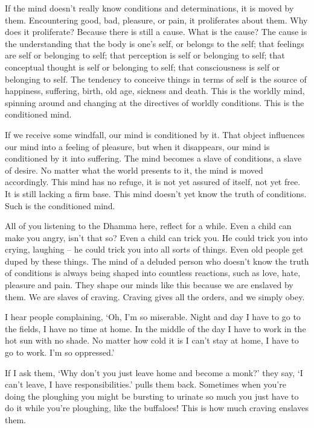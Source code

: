 If the mind doesn't really know conditions and determinations, it is moved by them. Encountering good, bad, pleasure, or pain, it proliferates about them. Why does it proliferate? Because there is still a cause. What is the cause? The cause is the understanding that the body is one's self, or belongs to the self; that feelings are self or belonging to self; that perception is self or belonging to self; that conceptual thought is self or belonging to self; that consciousness is self or belonging to self. The tendency to conceive things in terms of self is the source of happiness, suffering, birth, old age, sickness and death. This is the worldly mind, spinning around and changing at the directives of worldly conditions. This is the conditioned mind.

If we receive some windfall, our mind is conditioned by it. That object influences our mind into a feeling of pleasure, but when it disappears, our mind is conditioned by it into suffering. The mind becomes a slave of conditions, a slave of desire. No matter what the world presents to it, the mind is moved accordingly. This mind has no refuge, it is not yet assured of itself, not yet free. It is still lacking a firm base. This mind doesn't yet know the truth of conditions. Such is the conditioned mind.

All of you listening to the Dhamma here, reflect for a while. Even a child can make you angry, isn't that so? Even a child can trick you. He could trick you into crying, laughing -- he could trick you into all sorts of things. Even old people get duped by these things. The mind of a deluded person who doesn't know the truth of conditions is always being shaped into countless reactions, such as love, hate, pleasure and pain. They shape our minds like this because we are enslaved by them. We are slaves of  craving. Craving gives all the orders, and we simply obey.

I hear people complaining, `Oh, I'm so miserable. Night and day I have to go to the fields, I have no time at home. In the middle of the day I have to work in the hot sun with no shade. No matter how cold it is I can't stay at home, I have to go to work. I'm so oppressed.'

If I ask them, `Why don't you just leave home and become a monk?' they say, `I can't leave, I have responsibilities.'  pulls them back. Sometimes when you're doing the ploughing you might be bursting to urinate so much you just have to do it while you're ploughing, like the buffaloes! This is how much craving enslaves them.


